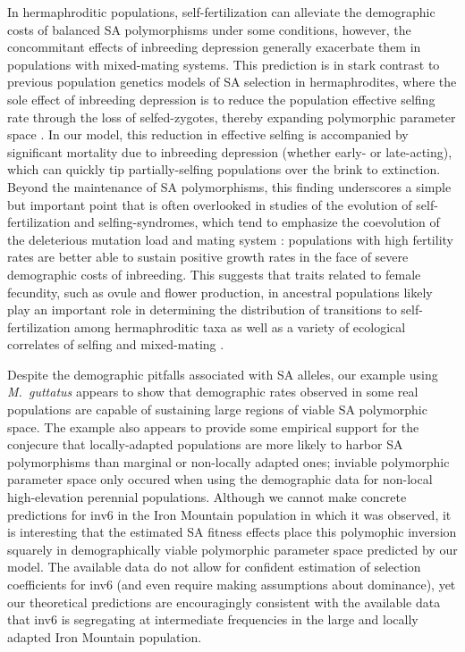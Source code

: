\documentclass[11pt,draft]{article}
\begin{document}
In hermaphroditic populations, self-fertilization can alleviate the demographic costs of balanced SA polymorphisms under some conditions, however, the concommitant effects of inbreeding depression generally exacerbate them in populations with mixed-mating systems. This prediction is in stark contrast to previous population genetics models of SA selection in hermaphrodites, where the sole effect of inbreeding depression is to reduce the population effective selfing rate through the loss of selfed-zygotes, thereby expanding polymorphic parameter space \citep{JordanConnallon2014, Olito2017}. In our model, this reduction in effective selfing is accompanied by significant mortality due to inbreeding depression (whether early- or late-acting), which can quickly tip partially-selfing populations over the brink to extinction. Beyond the maintenance of SA polymorphisms, this finding underscores a simple but important point that is often overlooked in studies of the evolution of self-fertilization and selfing-syndromes, which tend to emphasize the coevolution of the deleterious mutation load and mating system \citep[e.g.,][]{Charlesworth1987, LandeSchemske1985, Goodwillie2005}: populations with high fertility rates are better able to sustain positive growth rates in the face of severe demographic costs of inbreeding. This suggests that traits related to female fecundity, such as ovule and flower production, in ancestral populations likely play an important role in determining the distribution of transitions to self-fertilization among hermaphroditic taxa as well as a variety of ecological correlates of selfing and mixed-mating \citep{Goodwillie2005,Igic2006,Grossenbacher2015}.

Despite the demographic pitfalls associated with SA alleles, our example using {\itshape M.~guttatus} appears to show that demographic rates observed in some real populations are capable of sustaining large regions of viable SA polymorphic space. The example also appears to provide some empirical support for the conjecure that locally-adapted populations are more likely to harbor SA polymorphisms than marginal or non-locally adapted ones; inviable polymorphic parameter space only occured when using the demographic data for non-local high-elevation perennial populations. Although we cannot make concrete predictions for inv6 in the Iron Mountain population in which it was observed, it is interesting that the estimated SA fitness effects place this polymophic inversion squarely in demographically viable polymorphic parameter space predicted by our model. The available data do not allow for confident estimation of selection coefficients for inv6 (and even require making assumptions about dominance), yet our theoretical predictions are encouragingly consistent with the available data that inv6 is segregating at intermediate frequencies in the large and locally adapted Iron Mountain population. 
\end{document}
